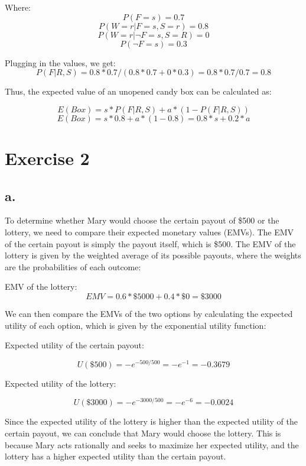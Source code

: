 \documentclass{article}
\begin{document}
Where:
\[P(F = s) = 0.7\]
\[P(W = r|F = s, S = r) = 0.8\]
\[P(W = r|\neg F = s, S = R) = 0\]
\[P(\neg F = s) = 0.3\]

Plugging in the values, we get:
\[P(F|R,S) = 0.8 * 0.7 / (0.8 * 0.7 + 0 * 0.3) = 0.8 * 0.7 / 0.7 = 0.8\]

Thus, the expected value of an unopened candy box can be calculated as:

\[E(Box) = s * P(F|R,S) + a * (1 - P(F|R,S))\]
\[E(Box) = s * 0.8 + a * (1 - 0.8) = 0.8 * s + 0.2 * a\]

\section*{Exercise 2}

\subsection*{a.}

To determine whether Mary would choose the certain payout of \$500 or the lottery, we need to compare their expected monetary values (EMVs). The EMV of the certain payout is simply the payout itself, which is \$500. The EMV of the lottery is given by the weighted average of its possible payouts, where the weights are the probabilities of each outcome:

EMV of the lottery:
\[EMV = 0.6 * \$5000 + 0.4 * \$0 = \$3000\]

We can then compare the EMVs of the two options by calculating the expected utility of each option, which is given by the exponential utility function:

Expected utility of the certain payout: 

\[U(\$500) = -e^{-500/500} = -e^{-1} = -0.3679\]

Expected utility of the lottery: 

\[U(\$3000) = -e^{-3000/500} = -e^{-6} = -0.0024\]

Since the expected utility of the lottery is higher than the expected utility of the certain payout, we can conclude that Mary would choose the lottery. This is because Mary acts rationally and seeks to maximize her expected utility, and the lottery has a higher expected utility than the certain payout.
\end{document}
